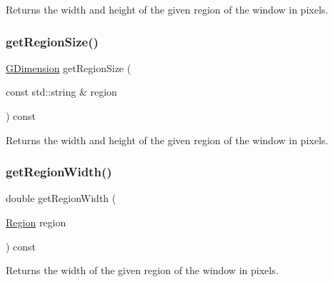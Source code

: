 Returns the width and height of the given region of the window in pixels. 

\mbox{\label{classsgl_1_1GWindow_a68b18b38b72cb8779fca0c3882549a6b}} 
\subsubsection{\texorpdfstring{get\+Region\+Size()}{getRegionSize()}\hspace{0.1cm}{\footnotesize\ttfamily [2/2]}}
{\footnotesize\ttfamily \mbox{\hyperlink{structsgl_1_1GDimension}{G\+Dimension}} get\+Region\+Size (\begin{DoxyParamCaption}\item[{const std\+::string \&}]{region }\end{DoxyParamCaption}) const\hspace{0.3cm}{\ttfamily [virtual]}}



Returns the width and height of the given region of the window in pixels. 

\mbox{\label{classsgl_1_1GWindow_a96e2005c3f447a8679c3c32d3fc02de1}} 
\subsubsection{\texorpdfstring{get\+Region\+Width()}{getRegionWidth()}\hspace{0.1cm}{\footnotesize\ttfamily [1/2]}}
{\footnotesize\ttfamily double get\+Region\+Width (\begin{DoxyParamCaption}\item[{\mbox{\hyperlink{classsgl_1_1GWindow_a81a01a86de31071a92e6cce0bab9bc4b}{Region}}}]{region }\end{DoxyParamCaption}) const\hspace{0.3cm}{\ttfamily [virtual]}}



Returns the width of the given region of the window in pixels. 

\mbox{\label{classsgl_1_1GWindow_ab169dab454fc90f1c845b91b4e1a8a14}} 
